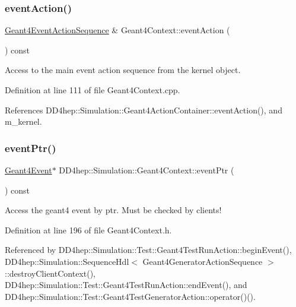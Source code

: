 \subsubsection{\texorpdfstring{event\+Action()}{eventAction()}}
{\footnotesize\ttfamily \hyperlink{class_d_d4hep_1_1_simulation_1_1_geant4_event_action_sequence}{Geant4\+Event\+Action\+Sequence} \& Geant4\+Context\+::event\+Action (\begin{DoxyParamCaption}{ }\end{DoxyParamCaption}) const}



Access to the main event action sequence from the kernel object. 



Definition at line 111 of file Geant4\+Context.\+cpp.



References D\+D4hep\+::\+Simulation\+::\+Geant4\+Action\+Container\+::event\+Action(), and m\+\_\+kernel.

\hypertarget{class_d_d4hep_1_1_simulation_1_1_geant4_context_a2f26e1b3fecec8178880ce8e379f6531}{}\label{class_d_d4hep_1_1_simulation_1_1_geant4_context_a2f26e1b3fecec8178880ce8e379f6531} 
\subsubsection{\texorpdfstring{event\+Ptr()}{eventPtr()}}
{\footnotesize\ttfamily \hyperlink{class_d_d4hep_1_1_simulation_1_1_geant4_event}{Geant4\+Event}$\ast$ D\+D4hep\+::\+Simulation\+::\+Geant4\+Context\+::event\+Ptr (\begin{DoxyParamCaption}{ }\end{DoxyParamCaption}) const\hspace{0.3cm}{\ttfamily [inline]}}



Access the geant4 event by ptr. Must be checked by clients! 



Definition at line 196 of file Geant4\+Context.\+h.



Referenced by D\+D4hep\+::\+Simulation\+::\+Test\+::\+Geant4\+Test\+Run\+Action\+::begin\+Event(), D\+D4hep\+::\+Simulation\+::\+Sequence\+Hdl$<$ Geant4\+Generator\+Action\+Sequence $>$\+::destroy\+Client\+Context(), D\+D4hep\+::\+Simulation\+::\+Test\+::\+Geant4\+Test\+Run\+Action\+::end\+Event(), and D\+D4hep\+::\+Simulation\+::\+Test\+::\+Geant4\+Test\+Generator\+Action\+::operator()().

